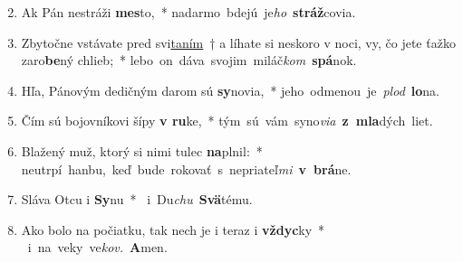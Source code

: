 \begin{flushleft}
\begin{enumerate}[leftmargin=*]
\setcounter{enumi}{1}
\item Ak Pán nestráži \textbf{mes}to,~* \mbox{nadarmo bdejú je\textit{ho} \textbf{stráž}covia.}
\item Zbytočne vstávate pred svi\underline{taním}~† a líhate si neskoro v noci, vy, čo jete ťažko zaro\textbf{be}ný chlieb;~* \mbox{lebo on dáva svojim miláč\textit{kom} \textbf{spá}nok.}
\item Hľa, Pánovým dedičným darom sú \textbf{sy}novia,~* \mbox{jeho odmenou je \textit{plod} \textbf{lo}na.}
\item Čím sú bojovníkovi šípy \textbf{v ru}ke,~* \mbox{tým sú vám syno\textit{via} \textbf{z mla}dých liet.}
\item Blažený muž, ktorý si nimi tulec \textbf{na}plnil:~* \mbox{neutrpí hanbu, keď bude rokovať s nepriateľ\textit{mi} \textbf{v brá}ne.}
\item Sláva Otcu i \textbf{Sy}nu~* \mbox{ i Du\textit{chu} \textbf{Svä}tému.}
\item Ako bolo na počiatku, tak nech je i teraz i \textbf{vždyc}ky~* \mbox{ i na veky ve\textit{kov.} \textbf{A}men.}\end{enumerate}
\end{flushleft}

